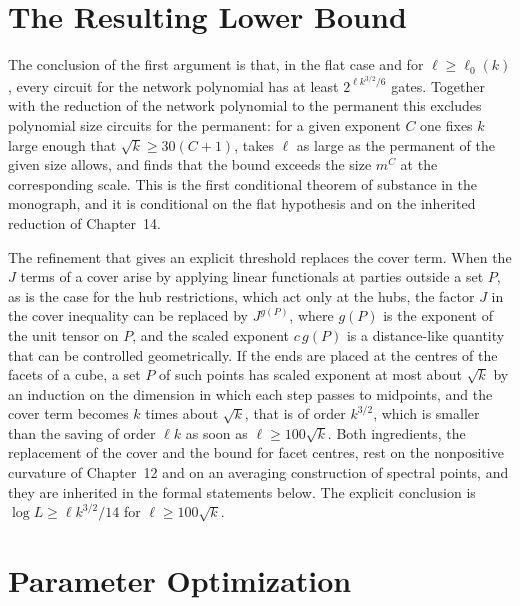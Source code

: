 \documentclass[11pt,letterpaper]{report}
\theoremstyle{plain}
\theoremstyle{definition}
\theoremstyle{remark}
\begin{document}
\section{The Resulting Lower Bound}

The conclusion of the first argument is that, in the flat case and for $\ell\ge\ell_0(k)$, every circuit for the network polynomial has at least $2^{\ell k^{3/2}/6}$ gates. Together with the reduction of the network polynomial to the permanent this excludes polynomial size circuits for the permanent: for a given exponent $C$ one fixes $k$ large enough that $\sqrt k\ge30(C+1)$, takes $\ell$ as large as the permanent of the given size allows, and finds that the bound exceeds the size $m^{C}$ at the corresponding scale. This is the first conditional theorem of substance in the monograph, and it is conditional on the flat hypothesis and on the inherited reduction of Chapter~14.

The refinement that gives an explicit threshold replaces the cover term. When the $J$ terms of a cover arise by applying linear functionals at parties outside a set $P$, as is the case for the hub restrictions, which act only at the hubs, the factor $J$ in the cover inequality can be replaced by $J^{g(P)}$, where $g(P)$ is the exponent of the unit tensor on $P$, and the scaled exponent $c\,g(P)$ is a distance-like quantity that can be controlled geometrically. If the ends are placed at the centres of the facets of a cube, a set $P$ of such points has scaled exponent at most about $\sqrt k$ by an induction on the dimension in which each step passes to midpoints, and the cover term becomes $k$ times about $\sqrt k$, that is of order $k^{3/2}$, which is smaller than the saving of order $\ell k$ as soon as $\ell\ge100\sqrt k$. Both ingredients, the replacement of the cover and the bound for facet centres, rest on the nonpositive curvature of Chapter~12 and on an averaging construction of spectral points, and they are inherited in the formal statements below. The explicit conclusion is $\log L\ge\ell k^{3/2}/14$ for $\ell\ge100\sqrt k$.

\section{Parameter Optimization}
\end{document}
